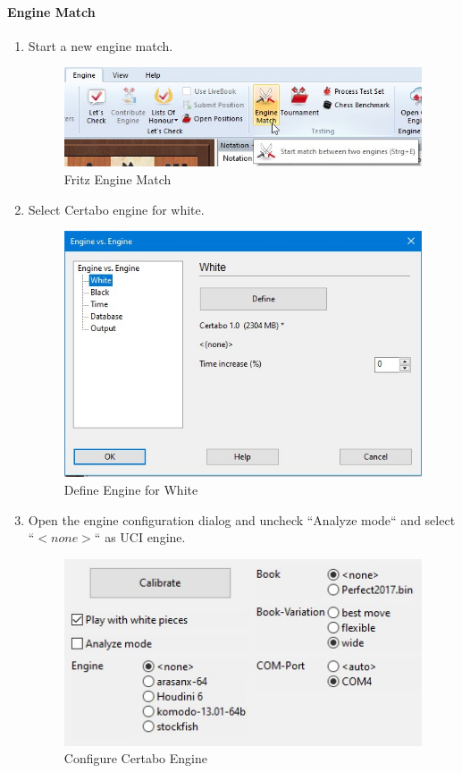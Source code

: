 \documentclass[11pt,a4paper]{article}
\begin{document}
\paragraph{Engine Match}
\begin{enumerate}
	\item Start a new engine match.
	\begin{figure}[H]
		\centering
		\includegraphics[scale=0.6]{fritz_enginematch.jpg}
		\caption{Fritz Engine Match}
		\label{fig:FritzEngineMatch}
	\end{figure}
	\item Select Certabo engine for white.
		\begin{figure}[H]
		\centering
		\includegraphics[scale=0.6]{fritz_enginewhite.jpg}
		\caption{Define Engine for White}
		\label{fig:FritzEngineWhite}
	\end{figure}
	\item Open the engine configuration dialog and uncheck ``Analyze mode`` and select ``\begin{math}<none>\end{math}`` as UCI engine.
			\begin{figure}[H]
		\centering
		\includegraphics[scale=0.8]{fritz_engine_configure_certabo.jpg}
		\caption{Configure Certabo Engine}
		\label{fig:FritzConfigureCertabo}
	\end{figure}


\end{enumerate}
\end{document}
